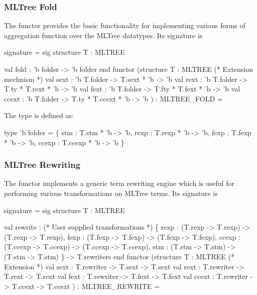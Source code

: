 \subsubsection{MLTree Fold}
The functor 
provides the basic functionality for implementing various forms of
aggregation function over the MLTree datatypes.  Its signature is
\begin{SML}
signature  =
sig
   structure T : MLTREE

   val fold : 'b folder -> 'b folder
end
functor 
  (structure T : MLTREE
   (* Extension mechnism *)
   val sext  : 'b T.folder -> T.sext * 'b -> 'b
   val rext  : 'b T.folder -> T.ty * T.rext * 'b -> 'b
   val fext  : 'b T.folder -> T.fty * T.fext * 'b -> 'b
   val ccext : 'b T.folder -> T.ty * T.ccext * 'b -> 'b
  ) : MLTREE_FOLD =
\end{SML}
The type  is defined as:
\begin{SML}
   type 'b folder =
       \{ stm   : T.stm * 'b -> 'b,
         rexp  : T.rexp * 'b -> 'b,
         fexp  : T.fexp * 'b -> 'b, 
         ccexp : T.ccexp * 'b -> 'b
       \}
\end{SML}


\subsubsection{MLTree Rewriting}

The functor 
implements a generic term rewriting engine which is useful for performing
various transformations on MLTree terms. Its signature is
\begin{SML}
signature  =
sig
   structure T : MLTREE

  val rewrite : 
       (* User supplied transformations *)
       \{ rexp  : (T.rexp -> T.rexp) -> (T.rexp -> T.rexp), 
         fexp  : (T.fexp -> T.fexp) -> (T.fexp -> T.fexp),
         ccexp : (T.ccexp -> T.ccexp) -> (T.ccexp -> T.ccexp),
         stm   : (T.stm -> T.stm) -> (T.stm -> T.stm)
       \} -> T.rewriters
end
functor 
  (structure T : MLTREE
   (* Extension *)
   val sext : T.rewriter -> T.sext -> T.sext
   val rext : T.rewriter -> T.rext -> T.rext
   val fext : T.rewriter -> T.fext -> T.fext
   val ccext : T.rewriter -> T.ccext -> T.ccext
  ) : MLTREE_REWRITE =
\end{SML}

